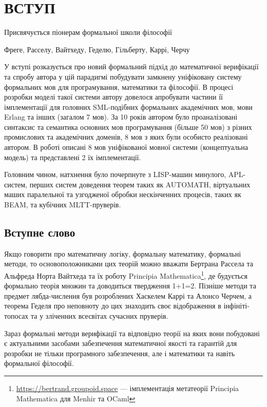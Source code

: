 \chapter*{ВСТУП}
\epigraph{Присвячується піонерам формальної школи філософії}
         {Фреге, Расселу, Вайтхеду, Геделю, Гільберту, Каррі, Черчу}

У вступі розказується про новий формальний підхід до математичної верифікації та спробу автора
у цій парадигмі побудувати замкнену уніфіковану систему формальних мов для
програмування, математики та філософії. В процесі розробки моделі такої системи автору
довелося апробувати частини її імплементації для головних SML-подібних формальних академічних мов,
мови Erlang та інших (загалом 7 мов). За 10 років автором було проаналізовані
синтаксис та семантика основних мов програмування (більше 50 мов) з різних промислових
та академічних доменів, 8 мов з яких були особисто реалізовані автором. В роботі
описані 8 мов уніфікованої мовної системи (концептуальна модель) та представлені 2 їх імплементації.

Головним чином, натхнення було почерпнуте з LISP-машин минулого, APL-систем,
перших систем доведення теорем таких як AUTOMATH, віртуальних маших паралельної
та узгодженої обробки нескінченних процесів, таких як BEAM, та кубічних MLTT-пруверів.

\section*{Вступне слово}
Якщо говорити про математичну логіку, формальну математику, формальні методи,
то основоположниками цих теорій можно вважати Бертрана Рассела та Альфреда Норта Вайтхеда та їх роботу
Principia Mathematica\footnote{\url{https://bertrand.groupoid.space} --- імплементація
метатеорії Principia Mathematica для Menhir та OCaml},
де будується формально теорія множин та доводиться твердження 1+1=2. Пізніше методи та предмет
лябда-числення був розроблених Хаскелем Каррі та Алонсо Черчем, а теорема Геделя про неповноту до цих
знаходить своє відображення в інфініті-топосах та у зліченних всесвітах сучасних пруверів.

Зараз формальні методи верифікації та відповідно теорії на яких вони побудовані
є актуальними засобами забезпечення математичної якості та гарантій для розробки не тільки
програмного забезпечення, але і математики та навіть формальної філософії.

